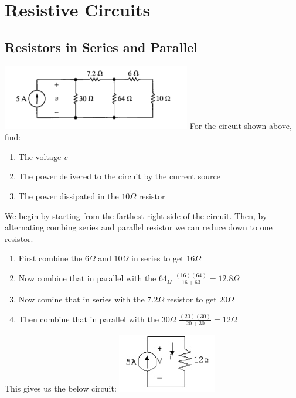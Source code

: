 \section{Resistive Circuits}

\subsection{Resistors in Series and Parallel}
\includegraphics[scale=0.5]{img/c3/p1}
For the circuit shown above, find:
\begin{enumerate}
	\item The voltage $v$
	\item The power delivered to the circuit by the current source
	\item The power dissipated in the $10 \Omega$ resistor
\end{enumerate}

We begin by starting from the farthest right side of the circuit. Then, by alternating combing
series and parallel resistor we can reduce down to one resistor. 
\begin{enumerate}
	\item First combine the $6\Omega$ and $10\Omega$ in series to get $16\Omega$
	\item Now combine that in parallel with the $64_\Omega$ $\frac{(16)(64)}{16+63} = 12.8\Omega$
	\item Now comine that in series with the $7.2\Omega$ resistor to get $20 \Omega$
	\item Then combine that in parallel with the $30\Omega$ $\frac{(20)(30)}{20+30} = 12\Omega$
\end{enumerate} 
This gives us the below circuit:
\includegraphics{img/c3/a1}

